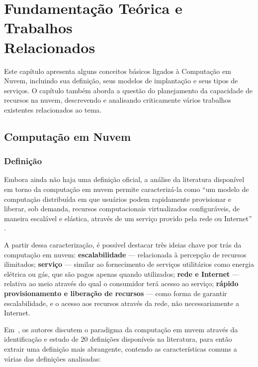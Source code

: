 \chapter[Fundamentação Teórica e Trabalhos Relacionados]{Fundamentação Teórica e Trabalhos\\Relacionados}

Este capítulo apresenta alguns conceitos básicos ligados à Computação em Nuvem, incluindo sua definição, seus modelos de implantação e seus tipos de serviços. O capítulo também aborda a questão do planejamento da capacidade de recursos na nuvem, descrevendo e analisando criticamente vários trabalhos existentes relacionados ao tema.

\section{Computação em Nuvem}

\subsection{Definição}

Embora ainda não haja uma definição oficial, a análise da literatura disponível 
em torno da computação em nuvem permite caracterizá-la como ``um modelo de computação 
distribuída em que usuários podem rapidamente provisionar e liberar, sob demanda, recursos 
computacionais virtualizados configuráveis, de maneira escalável e elástica, através 
de um serviço provido pela rede ou Internet'' 
\cite{foster2009cloud,cearley2010case,mell2011nist}. 

A partir dessa caracterização, é possível destacar três ideias chave por trás da computação em nuvem: \textbf{escalabilidade} --- 
relacionada à percepção de recursos ilimitados; \textbf{serviço} --- similar ao 
fornecimento de serviços utilitários como energia elétrica ou gás, que são pagos 
apenas quando utilizados; \textbf{rede e Internet} --- relativa ao meio através do qual o 
consumidor terá acesso ao serviço; \textbf{rápido provisionamento e liberação de recursos}
 --- como forma de garantir escalabilidade, e o acesso aos recursos através da rede, não
necessariamente a Internet.

Em~\cite{vaquero2008break}, os autores discutem o paradigma da computação em
nuvem através da identificação e estudo de 20 definições disponíveis na literatura, 
para então extrair uma definição mais abrangente, contendo as características comuns 
a várias das definições analisadas:

